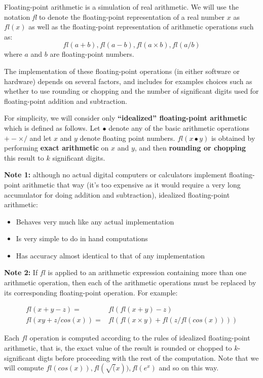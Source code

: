 \documentclass [titlepage,12pt,letter] {article}
\begin{document}
Floating-point arithmetic is a simulation of real arithmetic. We will
use the notation {\it fl} to denote the floating-point representation
of a real number $x$ as $fl(x)$ as well as the floating-point representation of arithmetic operations such as: 
\[
fl(a+b), fl(a-b), fl(a \times b), fl(a/b) 
\]
\noindent
where $a$ and $b$ are floating-point numbers. 

The implementation of these floating-point operations (in either software or hardware) depends on several factors, and includes for examples choices such as whether to use rounding or chopping and the number of significant digits used for floating-point addition and subtraction. 

For simplicity, we will consider only {\bf ``idealized'' floating-point arithmetic} which is defined as follows. Let $\bullet$ denote any of the basic arithmetic operations $+ - \times /$ and let $x$ and $y$ denote floating point numbers. $fl(x \bullet y)$ is obtained by performing {\bf exact arithmetic} on $x$ and $y$, and then {\bf rounding or chopping} this result to $k$ significant digits. 

\noindent 
{\bf Note 1:} although no actual digital computers or calculators implement floating-point arithmetic that way (it's too expensive as it would require a very long accumulator for doing addition and subtraction), idealized floating-point arithmetic: 
\begin{itemize} 
\item Behaves very much like any actual implementation 
\item Is very simple to do in hand computations 
\item Has accuracy almost identical to that of any implementation
\end{itemize} 


\noindent 
{\bf Note 2:} If $fl$ is applied to an arithmetic expression containing more than one arithmetic operation, then each of the arithmetic operations must be replaced by its corresponding floating-point operation. For example: 

\begin{eqnarray}
fl(x + y - z) =& fl(fl(x+y)-z) \\ 
fl(xy + z /cos(x)) =& fl(fl(x \times y)+fl(z/fl(cos(x))))
\end{eqnarray}

Each $fl$ operation is computed according to the rules of idealized floating-point arithmetic, that is, the exact value of the result is rounded or chopped to $k$-significant digts before proceeding with the rest of the computation. Note that we will compute $fl(cos(x)), fl(\sqrt(x)), fl(e^x)$ and so on this way. 
\end{document}
